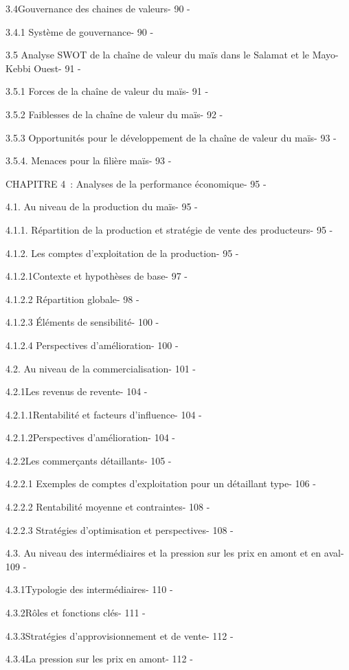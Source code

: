 \documentclass[12pt,oneside]{report}
\begin{document}
3.4Gouvernance des chaines de valeurs- 90 -

3.4.1 Système de gouvernance- 90 -

3.5 Analyse SWOT de la chaîne de valeur du maïs dans le Salamat et le Mayo-Kebbi Ouest- 91 -

3.5.1 Forces de la chaîne de valeur du maïs- 91 -

3.5.2 Faiblesses de la chaîne de valeur du maïs- 92 -

3.5.3 Opportunités pour le développement de la chaîne de valeur du maïs- 93 -

3.5.4. Menaces pour la filière maïs- 93 -

CHAPITRE 4 : Analyses de la performance économique- 95 -

4.1. Au niveau de la production du maïs- 95 -

4.1.1. Répartition de la production et stratégie de vente des producteurs- 95 -

4.1.2. Les comptes d’exploitation de la production- 95 -

4.1.2.1Contexte et hypothèses de base- 97 -

4.1.2.2 Répartition globale- 98 -

4.1.2.3 Éléments de sensibilité- 100 -

4.1.2.4 Perspectives d’amélioration- 100 -

4.2. Au niveau de la commercialisation- 101 -

4.2.1Les revenus de revente- 104 -

4.2.1.1Rentabilité et facteurs d’influence- 104 -

4.2.1.2Perspectives d’amélioration- 104 -

4.2.2Les commerçants détaillants- 105 -

4.2.2.1 Exemples de comptes d’exploitation pour un détaillant type- 106 -

4.2.2.2 Rentabilité moyenne et contraintes- 108 -

4.2.2.3 Stratégies d’optimisation et perspectives- 108 -

4.3. Au niveau des intermédiaires et la pression sur les prix en amont et en aval- 109 -

4.3.1Typologie des intermédiaires- 110 -

4.3.2Rôles et fonctions clés- 111 -

4.3.3Stratégies d'approvisionnement et de vente- 112 -

4.3.4La pression sur les prix en amont- 112 -
\end{document}
